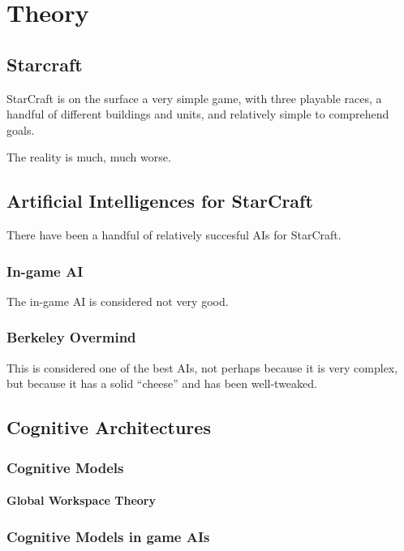 \chapter{Theory}
\section{Starcraft}
StarCraft is on the surface a very simple game, with three playable races, a
handful of different buildings and units, and relatively simple to comprehend
goals.

The reality is much, much worse.

\section{Artificial Intelligences for StarCraft}
There have been a handful of relatively succesful AIs for StarCraft.

\subsection{In-game AI}
The in-game AI is considered not very good.

\subsection{Berkeley Overmind}
This is considered one of the best AIs, not perhaps because it is very complex,
but because it has a solid ``cheese'' and has been well-tweaked.


\section{Cognitive Architectures}
\subsection{Cognitive Models}
\subsubsection{Global Workspace Theory}
\subsection{Cognitive Models in game AIs}